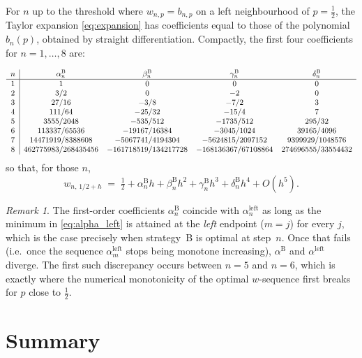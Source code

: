 \documentclass{article}
\theoremstyle{remark}
\newtheorem*{remark}{Remark}
\begin{document}
For $n$ up to the threshold where $w_{n,p}=b_{n,p}$ on a left
neighbourhood of $p=\tfrac12$, the Taylor expansion
\eqref{eq:expansion} has coefficients equal to those of the polynomial
$b_{n}(p)$, obtained by straight differentiation. Compactly, the first
four coefficients for $n=1,\dots,8$ are:

\[
\small
\begin{array}{c|cccc}
  n & \alpha_{n}^{\text{B}} & \beta_{n}^{\text{B}} & \gamma_{n}^{\text{B}} & \delta_{n}^{\text{B}}\\\hline
  1 & 1 & 0 & 0 & 0\\
  2 & 3/2 & 0 & -2 & 0\\
  3 & 27/16 & -3/8 & -7/2 & 3\\
  4 & 111/64 & -25/32 & -15/4 & 7\\
  5 & 3555/2048 & -535/512 & -1735/512 & 295/32\\
  6 & 113337/65536 & -19167/16384 & -3045/1024 & 39165/4096\\
  7 & 14471919/8388608 & -5067741/4194304 & -5624815/2097152 & 9399929/1048576\\
  8 & 462775983/268435456 & -161718519/134217728 & -168136367/67108864 & 274696555/33554432
\end{array}
\]
so that, for those $n$,
\[
  w_{n,\,1/2+h}\;=\;\tfrac12
  +\alpha_{n}^{\text{B}}h+\beta_{n}^{\text{B}}h^{2}
  +\gamma_{n}^{\text{B}}h^{3}+\delta_{n}^{\text{B}}h^{4}+O(h^{5}).
\]

\begin{remark}
  The first-order coefficients $\alpha_{n}^{\text{B}}$ coincide with
  $\alpha_{n}^{\text{left}}$ as long as the minimum in
  \eqref{eq:alpha_left} is attained at the \emph{left} endpoint
  ($m=j$) for every $j$, which is the case precisely when strategy~B is
  optimal at step~$n$. Once that fails (i.e.\ once the sequence
  $\alpha_{m}^{\text{left}}$ stops being monotone increasing), $\alpha^{\text{B}}$
  and $\alpha^{\text{left}}$ diverge. The first such discrepancy occurs
  between $n=5$ and $n=6$, which is exactly where the numerical
  monotonicity of the optimal $w$-sequence first breaks for $p$ close to
  $\tfrac12$.
\end{remark}

\section{Summary}
\end{document}
